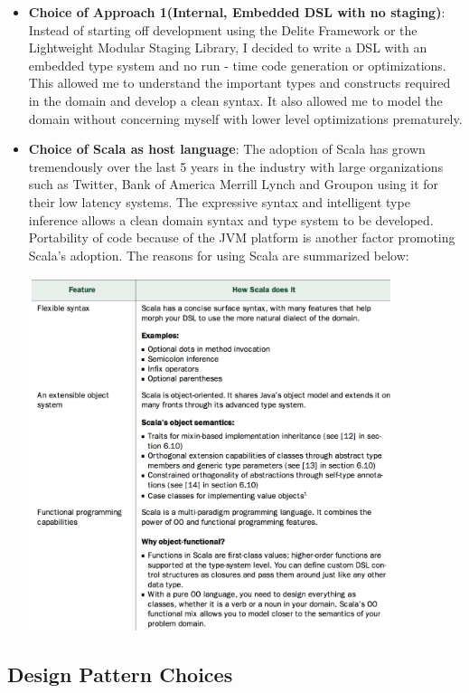 \documentclass[12 pt]{article}
\begin{document}
\begin{itemize}
\item \textbf{Choice of Approach 1(Internal, Embedded DSL with no staging)}: Instead of starting off development using the Delite Framework or the Lightweight Modular Staging Library, I decided to write a DSL with an embedded type system and no run - time code generation or optimizations. This allowed me to understand the important types and constructs required in the domain and develop a clean syntax. It also allowed me to model the domain without concerning myself with lower level optimizations prematurely.
\item \textbf{Choice of Scala as host language}: The adoption of Scala has grown tremendously over the last 5 years in the industry with large organizations such as Twitter, Bank of America Merrill Lynch and Groupon using it for their low latency systems. The expressive syntax and intelligent type inference allows a clean domain syntax and type system to be developed. Portability of code because of the JVM platform is another factor promoting Scala's adoption. The reasons for using Scala are summarized below:
\begin{center}
    \includegraphics[width=400px]{figures/scala_motivation.png}
\end{center}

\end{itemize}
\subsection{Design Pattern Choices}
\end{document}
